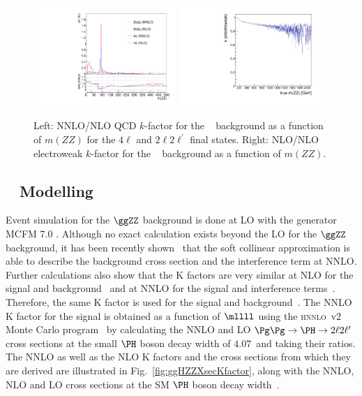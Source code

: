 \begin{figure}[!htb]
\vspace*{0.3cm}
\begin{center}
\includegraphics[width=0.48\textwidth]{Figures/IrrBkg/Kfactor_qqZZ_mZZ.pdf}
\includegraphics[width=0.48\textwidth]{Figures/IrrBkg/K_ewk_qqZZ.pdf} 
\caption{Left: NNLO/NLO QCD $k$-factor for the \qqZZ~ background as a function of $m(ZZ)$ for the $4\ell$ and $2\ell2\ell^{\prime}$ final states. Right: NLO/NLO electroweak $k$-factor for the \qqZZ~ background as a function of $m(ZZ)$.
\label{fig:qqZZKfactor}}
\end{center}
\end{figure}


\subsection{\ggZZ~ Modelling}

Event simulation for the $\ggZZ$ background is done at LO with the generator MCFM 7.0 \cite{MCFM,Campbell:2011bn,Campbell:2013una}.
Although no exact calculation exists beyond the LO for the $\ggZZ$ background, 
it has been recently shown~\cite{Bonvini:1304.3053} 
that the soft collinear approximation is able to describe the background cross section and the 
interference term at NNLO\@. Further calculations also show that the K factors are very similar at NLO for the signal 
and background~\cite{Melnikov:2015laa} and at NNLO for the signal and interference terms~\cite{Li:2015jva}. Therefore, the same K factor 
is used for the signal and background~\cite{Passarino:1312.2397v1}. The NNLO K factor for the signal is obtained as a function of $\mllll$ 
using the \textsc{hnnlo}~v2 Monte Carlo program~\cite{Catani:2007vq,Grazzini:2008tf,Grazzini:2013mca} by calculating the NNLO and LO 
$\Pg\Pg\to\PH\to2\ell2\ell^\prime$ cross sections at the small $\PH$ boson decay width of $4.07$~\MeV and taking their ratios. The NNLO as 
well as the NLO K factors and the cross sections from which they are derived are illustrated in Fig.~\ref{fig:ggHZZXsecKfactor}, 
along with the NNLO, NLO and LO cross sections at the SM $\PH$ boson decay width~\cite{Heinemeyer:2013tqa}.
 
